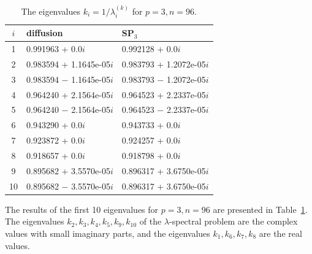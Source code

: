 \documentclass[a4paper]{jpconf}
\begin{document}
\begin{table}[h]
\caption{The eigenvalues $k_i=1/\lambda_i^{(k)}$ for $p=3, n=96$.}
\label{tab:hwr_lambda_10}
\begin{center}
\begin{tabular}{c l l }
\hline
$i$ & diffusion & SP$_3$  \\
\hline
1 & 0.991963 + 0.0$i$   & 0.992128 + 0.0$i$\\
2 & 0.983594 + 1.1645e-05$i$   & 0.983793 + 1.2072e-05$i$\\
3 & 0.983594 $-$ 1.1645e-05$i$ & 0.983793 $-$ 1.2072e-05$i$\\
4 & 0.964240 + 2.1564e-05$i$   & 0.964523 + 2.2337e-05$i$\\
5 & 0.964240 $-$ 2.1564e-05$i$ & 0.964523 $-$ 2.2337e-05$i$\\
6 & 0.943290 + 0.0$i$   & 0.943733 + 0.0$i$\\
7 & 0.923872 + 0.0$i$   & 0.924257 + 0.0$i$\\
8 & 0.918657 + 0.0$i$   & 0.918798 + 0.0$i$\\
9 & 0.895682 + 3.5570e-05$i$   & 0.896317 + 3.6750e-05$i$\\
10 & 0.895682 $-$ 3.5570e-05$i$& 0.896317 + 3.6750e-05$i$\\
\hline
\end{tabular}
\end{center}
\end{table}

The results of the first 10 eigenvalues for $ p = 3, n = 96 $ are presented in Table~\ref{tab:hwr_lambda_10}.
The eigenvalues $k_2, k_3, k_4, k_5, k_9, k_{10}$ of the $\lambda$-spectral problem are the complex values with small imaginary parts, and the eigenvalues $k_1, k_6, k_7, k_8$ are the real values. 
\end{document}
